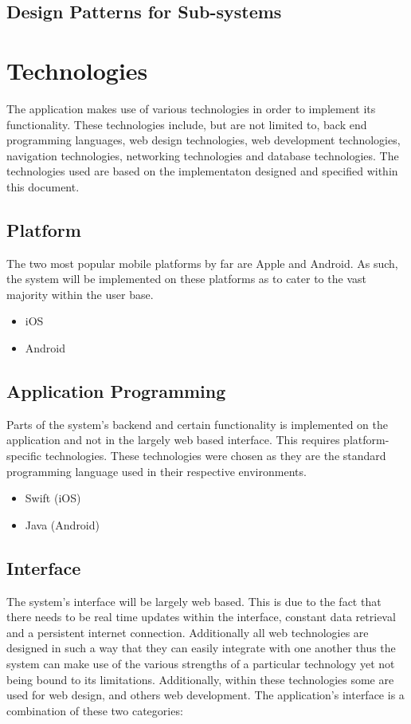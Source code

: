 \documentclass{article}
\begin{document}
	\subsection{Design Patterns for Sub-systems}

\section{Technologies}
The application makes use of various technologies in order to implement its functionality. These technologies include, but are not limited to, back end programming languages, web design technologies, web development technologies, navigation technologies, networking technologies and database technologies.  The technologies used are based on the implementaton designed and specified within this document.  
	\subsection{Platform}
The two most popular mobile platforms by far are Apple and Android.  As such, the system will be implemented on these platforms as to cater to the vast majority within the user base. 
		\begin{itemize}
			\item iOS
			\item Android
		\end{itemize}
	\subsection{Application Programming}
Parts of the system's backend and certain functionality is implemented on the application and not in the largely web based interface.  This requires platform-specific technologies. These technologies were chosen as they are the standard programming language used in their respective environments.
		\begin{itemize}
			\item Swift (iOS)
			\item Java (Android)
		\end{itemize}
	\subsection{Interface}
The system's interface will be largely web based. This is due to the fact that there needs to be real time updates within the interface, constant data retrieval and a persistent internet connection.  Additionally all web technologies are designed in such a way that they can easily integrate with one another thus the system can make use of the various strengths of a particular technology yet not being bound to its limitations.  Additionally, within these technologies some are used for web design, and others web development.  The application's interface is a combination of these two categories:
\end{document}
